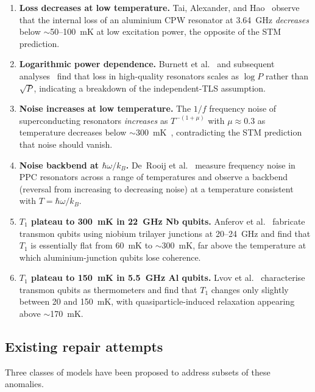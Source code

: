 \documentclass[11pt]{article}
\begin{document}
\begin{enumerate}[label=(\roman*)]
\item \textbf{Loss decreases at low temperature.}  Tai, Alexander, and Hao~\cite{Tai2024} observe that the internal loss of an aluminium CPW resonator at 3.64~GHz \emph{decreases} below $\sim$50--100~mK at low excitation power, the opposite of the STM prediction.

\item \textbf{Logarithmic power dependence.}  Burnett et al.~\cite{Burnett2014} and subsequent analyses~\cite{Burnett2016} find that loss in high-quality resonators scales as $\log P$ rather than $\sqrt{P}$, indicating a breakdown of the independent-TLS assumption.

\item \textbf{Noise increases at low temperature.}  The $1/f$ frequency noise of superconducting resonators \emph{increases} as $T^{-(1+\mu)}$ with $\mu \approx 0.3$ as temperature decreases below $\sim$300~mK~\cite{Burnett2014}, contradicting the STM prediction that noise should vanish.

\item \textbf{Noise backbend at $\hbar\omega/k_B$.}  De~Rooij et al.~\cite{deRooij2024} measure frequency noise in PPC resonators across a range of temperatures and observe a backbend (reversal from increasing to decreasing noise) at a temperature consistent with $T = \hbar\omega/k_B$.

\item \textbf{$T_1$ plateau to 300~mK in 22~GHz Nb qubits.}  Anferov et al.~\cite{Anferov2024} fabricate transmon qubits using niobium trilayer junctions at 20--24~GHz and find that $T_1$ is essentially flat from 60~mK to $\sim$300~mK, far above the temperature at which aluminium-junction qubits lose coherence.

\item \textbf{$T_1$ plateau to 150~mK in 5.5~GHz Al qubits.}  Lvov et al.~\cite{Lvov2025} characterise transmon qubits as thermometers and find that $T_1$ changes only slightly between 20 and 150~mK, with quasiparticle-induced relaxation appearing above $\sim$170~mK.
\end{enumerate}

\subsection{Existing repair attempts}

Three classes of models have been proposed to address subsets of these anomalies.
\end{document}
